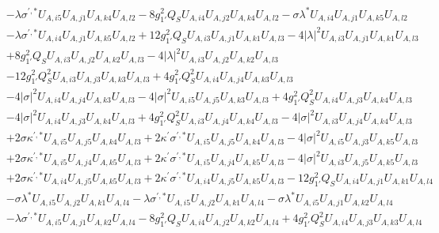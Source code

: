 \begin{align}
 &- \lambda \sigma^{\prime,*} U_{A,{i 5}} U_{A,{j 1}} U_{A,{k 4}} U_{A,{l 2}} -8 g_{1'}^{2} Q_{S} U_{A,{i 4}} U_{A,{j 2}} U_{A,{k 4}} U_{A,{l 2}} - \sigma \lambda^* U_{A,{i 4}} U_{A,{j 1}} U_{A,{k 5}} U_{A,{l 2}} \nonumber \\ 
 &- \lambda \sigma^{\prime,*} U_{A,{i 4}} U_{A,{j 1}} U_{A,{k 5}} U_{A,{l 2}} +12 g_{1'}^{2} Q_{S} U_{A,{i 3}} U_{A,{j 1}} U_{A,{k 1}} U_{A,{l 3}} -4 |\lambda|^2 U_{A,{i 3}} U_{A,{j 1}} U_{A,{k 1}} U_{A,{l 3}} \nonumber \\ 
 &+8 g_{1'}^{2} Q_{S} U_{A,{i 3}} U_{A,{j 2}} U_{A,{k 2}} U_{A,{l 3}} -4 |\lambda|^2 U_{A,{i 3}} U_{A,{j 2}} U_{A,{k 2}} U_{A,{l 3}} \nonumber \\ 
 &-12 g_{1'}^{2} Q_{S}^{2} U_{A,{i 3}} U_{A,{j 3}} U_{A,{k 3}} U_{A,{l 3}} +4 g_{1'}^{2} Q_{S}^{2} U_{A,{i 4}} U_{A,{j 4}} U_{A,{k 3}} U_{A,{l 3}} \nonumber \\ 
 &-4 |\sigma|^2 U_{A,{i 4}} U_{A,{j 4}} U_{A,{k 3}} U_{A,{l 3}} -4 |\sigma|^2 U_{A,{i 5}} U_{A,{j 5}} U_{A,{k 3}} U_{A,{l 3}} +4 g_{1'}^{2} Q_{S}^{2} U_{A,{i 4}} U_{A,{j 3}} U_{A,{k 4}} U_{A,{l 3}} \nonumber \\ 
 &-4 |\sigma|^2 U_{A,{i 4}} U_{A,{j 3}} U_{A,{k 4}} U_{A,{l 3}} +4 g_{1'}^{2} Q_{S}^{2} U_{A,{i 3}} U_{A,{j 4}} U_{A,{k 4}} U_{A,{l 3}} -4 |\sigma|^2 U_{A,{i 3}} U_{A,{j 4}} U_{A,{k 4}} U_{A,{l 3}} \nonumber \\ 
 &+2 \sigma \kappa^{\prime,*} U_{A,{i 5}} U_{A,{j 5}} U_{A,{k 4}} U_{A,{l 3}} +2 \kappa^\prime \sigma^{\prime,*} U_{A,{i 5}} U_{A,{j 5}} U_{A,{k 4}} U_{A,{l 3}} -4 |\sigma|^2 U_{A,{i 5}} U_{A,{j 3}} U_{A,{k 5}} U_{A,{l 3}} \nonumber \\ 
 &+2 \sigma \kappa^{\prime,*} U_{A,{i 5}} U_{A,{j 4}} U_{A,{k 5}} U_{A,{l 3}} +2 \kappa^\prime \sigma^{\prime,*} U_{A,{i 5}} U_{A,{j 4}} U_{A,{k 5}} U_{A,{l 3}} -4 |\sigma|^2 U_{A,{i 3}} U_{A,{j 5}} U_{A,{k 5}} U_{A,{l 3}} \nonumber \\ 
 &+2 \sigma \kappa^{\prime,*} U_{A,{i 4}} U_{A,{j 5}} U_{A,{k 5}} U_{A,{l 3}} +2 \kappa^\prime \sigma^{\prime,*} U_{A,{i 4}} U_{A,{j 5}} U_{A,{k 5}} U_{A,{l 3}} -12 g_{1'}^{2} Q_{S} U_{A,{i 4}} U_{A,{j 1}} U_{A,{k 1}} U_{A,{l 4}} \nonumber \\ 
 &- \sigma \lambda^* U_{A,{i 5}} U_{A,{j 2}} U_{A,{k 1}} U_{A,{l 4}} - \lambda \sigma^{\prime,*} U_{A,{i 5}} U_{A,{j 2}} U_{A,{k 1}} U_{A,{l 4}} - \sigma \lambda^* U_{A,{i 5}} U_{A,{j 1}} U_{A,{k 2}} U_{A,{l 4}} \nonumber \\ 
 &- \lambda \sigma^{\prime,*} U_{A,{i 5}} U_{A,{j 1}} U_{A,{k 2}} U_{A,{l 4}} -8 g_{1'}^{2} Q_{S} U_{A,{i 4}} U_{A,{j 2}} U_{A,{k 2}} U_{A,{l 4}} +4 g_{1'}^{2} Q_{S}^{2} U_{A,{i 4}} U_{A,{j 3}} U_{A,{k 3}} U_{A,{l 4}} \nonumber \\ 

\end{align}
